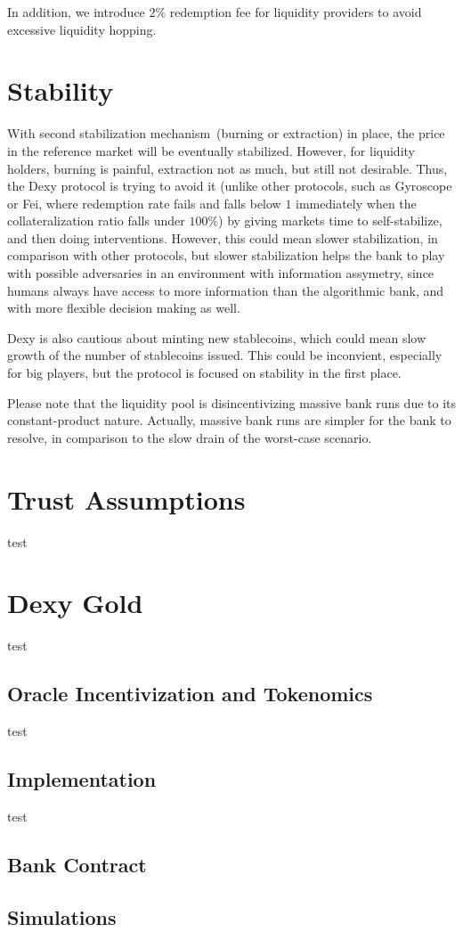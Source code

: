 \documentclass[a4paper,UKenglish,cleveref, autoref, thm-restate]{lipics-v2021}
\newcommand{\sct}{stablecoin}
\newcommand{\dx}{Dexy}
\begin{document}
In addition, we introduce $2\%$ redemption fee for liquidity providers to avoid excessive liquidity hopping.

\section{Stability}
\label{sec:stability}

With second stabilization mechanism~(burning or extraction) in place, the price in the reference market will be eventually stabilized. However, for liquidity holders, burning is painful, extraction not as much, but still not desirable. Thus, the \dx{} protocol is trying to avoid it (unlike other protocols, such as Gyroscope or Fei, where redemption rate fails and falls below $1$ immediately when the collateralization ratio falls under $100\%$) by giving markets time to self-stabilize, and then doing interventions. However, this could mean slower stabilization, in comparison with other protocols, but slower stabilization helps the bank to play with possible adversaries in an environment with information assymetry, since humans always have access to more information than the algorithmic bank, and with more flexible decision making as well.

\dx{} is also cautious about minting new \sct{}s, which could mean slow growth of the number of stablecoins issued. This could be inconvient, especially for big players, but the protocol is focused on stability in the first place. 

Please note that the liquidity pool is disincentivizing massive bank runs due to its constant-product nature. Actually, massive bank runs are simpler for the bank to resolve, in comparison to the slow drain of the worst-case scenario.

\section{Trust Assumptions}
\label{sec:kya}

test

\section{Dexy Gold}
\label{sec:dexygold}

test

\subsection{Oracle Incentivization and Tokenomics}

test

\subsection{Implementation}

test

\subsection{Bank Contract}

\subsection{Simulations}






\end{document}
